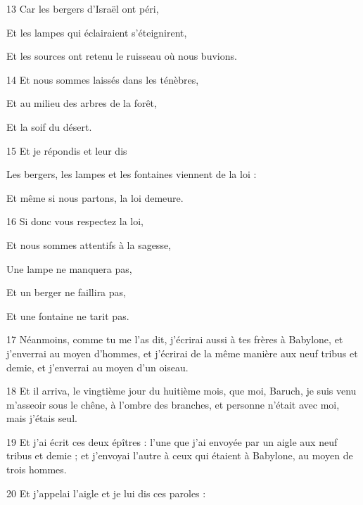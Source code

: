 \par 13 Car les bergers d'Israël ont péri,

\par Et les lampes qui éclairaient s'éteignirent,

\par Et les sources ont retenu le ruisseau où nous buvions.

\par 14 Et nous sommes laissés dans les ténèbres,

\par Et au milieu des arbres de la forêt,

\par Et la soif du désert.

\par 15 Et je répondis et leur dis

\par Les bergers, les lampes et les fontaines viennent de la loi :

\par Et même si nous partons, la loi demeure.

\par 16 Si donc vous respectez la loi,

\par Et nous sommes attentifs à la sagesse,

\par Une lampe ne manquera pas,

\par Et un berger ne faillira pas,

\par Et une fontaine ne tarit pas.

\par 17 Néanmoins, comme tu me l'as dit, j'écrirai aussi à tes frères à Babylone, et j'enverrai au moyen d'hommes, et j'écrirai de la même manière aux neuf tribus et demie, et j'enverrai au moyen d'un oiseau.

\par 18 Et il arriva, le vingtième jour du huitième mois, que moi, Baruch, je suis venu m'asseoir sous le chêne, à l'ombre des branches, et personne n'était avec moi, mais j'étais seul.

\par 19 Et j'ai écrit ces deux épîtres : l'une que j'ai envoyée par un aigle aux neuf tribus et demie ; et j'envoyai l'autre à ceux qui étaient à Babylone, au moyen de trois hommes.

\par 20 Et j'appelai l'aigle et je lui dis ces paroles :

